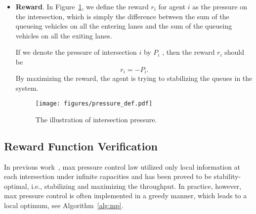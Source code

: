 \begin{itemize}
    \item \textbf{Reward}. In Figure~\ref{fig:pressure}, we define the reward $r_i$ for agent $i$ as the pressure on the intersection, which is simply the difference between the sum of the queueing vehicles on all the entering lanes and the sum of the queueing vehicles on all the exiting lanes.
    
    If we denote the pressure of intersection $i$ by $P_i$ , then the reward $r_i$ should be
        \begin{equation}
            \label{eq:reward-detail}
            r_i  = - P_i.
        \end{equation}
    By maximizing the reward, the agent is trying to stabilizing the queues in the system.
    \begin{figure}[htbp]
        \centering
        \texttt{[image: figures/pressure\_def.pdf]} %
        \caption{The illustration of intersection pressure.}%
        \label{fig:pressure}
        \end{figure}
\end{itemize}


\subsection{Reward Function Verification}
In previous work~\cite{varaiya2013max}, max pressure control law utilized only local information at each intersection under infinite capacities and has been proved to be stability-optimal, i.e., stabilizing and maximizing the throughput. In practice, however, max pressure control is often implemented in a greedy manner, which leads to a local optimum, see Algorithm~\ref{alg:mp}.


